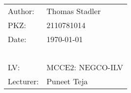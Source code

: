\begin{titlepage}
\begin{center}
\end{center}
\vspace{1cm}

\noindent\begin{tabular}{@{}ll}

Author:
&
Thomas Stadler
\\
PKZ:
&
2110781014
\\
Date:
&
\today
\\
~&~\\
LV:
&
MCCE2: NEGCO-ILV
\\
Lecturer:
&
Puneet Teja
\end{tabular}

\end{titlepage}
